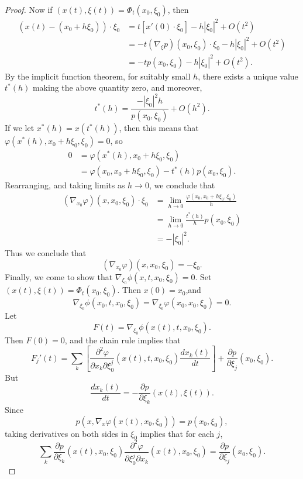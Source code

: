 \documentclass{article}
\theoremstyle{plain}
\theoremstyle{remark}
\theoremstyle{definition}
\begin{document}
\begin{proof}
	Now if $(x(t),\xi(t)) = \Phi_t(x_0,\xi_0)$, then
	\begin{align*}
		(x(t) - (x_0 + h \xi_0)) \cdot \xi_0 &= t[x'(0) \cdot \xi_0] - h |\xi_0|^2 + O(t^2)\\
		&= - t (\nabla_\xi p)(x_0,\xi_0) \cdot \xi_0 - h |\xi_0|^2 + O(t^2)\\
		&= - t p(x_0,\xi_0) - h |\xi_0|^2 + O(t^2). 
	\end{align*}
	By the implicit function theorem, for suitably small $h$, there exists a unique value $t^*(h)$ making the above quantity zero, and moreover,
	\[ t^*(h) = \frac{- |\xi_0|^2 h}{p(x_0,\xi_0)} + O(h^2). \]
	If we let $x^*(h) = x(t^*(h))$, then this means that $\varphi(x^*(h), x_0 + h \xi_0, \xi_0) = 0$, so
	\begin{align*}
		0 &= \varphi(x^*(h), x_0 + h \xi_0, \xi_0)\\
		&= \varphi(x_0, x_0 + h \xi_0, \xi_0) - t^*(h) p(x_0,\xi_0).
	\end{align*}
	Rearranging, and taking limits as $h \to 0$, we conclude that
	\begin{align*}
		(\nabla_{x_0} \varphi)(x,x_0,\xi_0) \cdot \xi_0 &= \lim_{h \to 0} \frac{\varphi(x_0, x_0 + h \xi_0, \xi_0)}{h}\\
		&= \lim_{h \to 0} \frac{t^*(h)}{h} p(x_0,\xi_0)\\
		&= - |\xi_0|^2.
	\end{align*}
	Thus we conclude that
	\begin{equation} \label{equationthreetime}
		(\nabla_{x_0} \varphi)(x,x_0,\xi_0) = - \xi_0.
	\end{equation}
	Finally, we come to show that $\nabla_{\xi_0} \phi(x,t,x_0,\xi_0) = 0$. Set $(x(t), \xi(t)) = \Phi_t(x_0,\xi_0)$. Then $x(0) = x_0$,and
	\[ \nabla_{\xi_0} \phi(x_0,t,x_0,\xi_0) = \nabla_{\xi_0} \varphi(x_0,x_0,\xi_0) = 0. \]
	Let
	\[ F(t) = \nabla_{\xi_0} \phi(x(t), t, x_0, \xi_0). \]
	Then $F(0) = 0$, and the chain rule implies that
	\[ F_j'(t) = \sum_k \left[ \frac{\partial^2 \varphi}{\partial x_k \partial \xi_0^j}(x(t), t, x_0, \xi_0) \frac{dx_k(t)}{dt} \right] + \frac{\partial p}{\partial \xi_j}(x_0,\xi_0). \]
	But
	\[ \frac{dx_k(t)}{dt} = - \frac{\partial p}{\partial \xi_k}( x(t), \xi(t) ). \]
	Since
	\[ p(x, \nabla_x \varphi(x(t) ,x_0,\xi_0)) = p(x_0, \xi_0), \]
	taking derivatives on both sides in $\xi_0$ implies that for each $j$,
	\[ \sum_k \frac{\partial p}{\partial \xi_k}(x(t), x_0, \xi_0) \frac{\partial^2 \varphi}{\partial \xi_0^j \partial x_k}(x(t), x_0, \xi_0) = \frac{\partial p}{\partial \xi_j}(x_0, \xi_0). \]

\end{proof}
\end{document}
